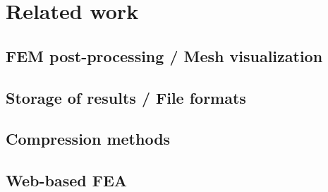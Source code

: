 \chapter{Related work}
\label{chapter:related-work}


\section{FEM post-processing / Mesh visualization}


\section{Storage of results / File formats}


\cite{VTK2015}
\cite{GiDPostProcess}

\cite{Ivanyi2012}


\section{Compression methods}


\section{Web-based FEA}

\cite{Ari2013}
\cite{Yu2010}
\cite{Peng2003}
\cite{Heber2007I}
\cite{Heber2007II}
\cite{Weng2011}
\cite{Chen2008}

